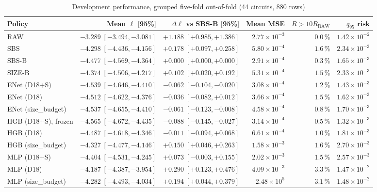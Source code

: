 \begin{table}[p]
\centering
\footnotesize
\setlength{\tabcolsep}{3.0pt}
\caption{Development performance, grouped five-fold out-of-fold (44 circuits, 880 rows)}
\label{tab:qem180-development}
\begin{tabular}{lrrrrr}
\toprule
Policy & Mean $\ell$ [95\%] & $\Delta\ell$ vs SBS-B [95\%] & Mean MSE & $R>10R_{\mathrm{RAW}}$ & $q_{95}$ risk \\
\midrule
RAW & $-3.289\;[-3.494,-3.081]$ & $+1.188\;[+0.985,+1.386]$ & $2.77\times10^{-3}$ & $0.0$\,\% & $1.42\times10^{-2}$ \\
SBS & $-4.298\;[-4.436,-4.156]$ & $+0.178\;[+0.097,+0.258]$ & $5.80\times10^{-4}$ & $1.6$\,\% & $2.34\times10^{-3}$ \\
SBS-B & $-4.477\;[-4.569,-4.364]$ & $+0.000\;[+0.000,+0.000]$ & $2.91\times10^{-4}$ & $0.3$\,\% & $1.65\times10^{-3}$ \\
SIZE-B & $-4.374\;[-4.506,-4.217]$ & $+0.102\;[+0.020,+0.192]$ & $5.31\times10^{-4}$ & $1.5$\,\% & $2.33\times10^{-3}$ \\
\midrule
ENet (D18+S) & $-4.539\;[-4.646,-4.410]$ & $-0.062\;[-0.104,-0.020]$ & $3.08\times10^{-4}$ & $1.2$\,\% & $1.43\times10^{-3}$ \\
ENet (D18) & $-4.512\;[-4.622,-4.376]$ & $-0.036\;[-0.082,+0.012]$ & $3.66\times10^{-4}$ & $1.5$\,\% & $1.62\times10^{-3}$ \\
ENet (size\_budget) & $-4.537\;[-4.655,-4.410]$ & $-0.061\;[-0.123,-0.008]$ & $4.58\times10^{-4}$ & $0.8$\,\% & $1.70\times10^{-3}$ \\
HGB (D18+S), frozen & $-4.565\;[-4.672,-4.435]$ & $-0.088\;[-0.145,-0.027]$ & $3.14\times10^{-4}$ & $0.5$\,\% & $1.32\times10^{-3}$ \\
HGB (D18) & $-4.487\;[-4.618,-4.346]$ & $-0.011\;[-0.094,+0.068]$ & $6.61\times10^{-4}$ & $1.0$\,\% & $1.81\times10^{-3}$ \\
HGB (size\_budget) & $-4.327\;[-4.477,-4.146]$ & $+0.150\;[+0.046,+0.263]$ & $1.58\times10^{-3}$ & $1.6$\,\% & $2.70\times10^{-3}$ \\
MLP (D18+S) & $-4.404\;[-4.531,-4.245]$ & $+0.073\;[-0.003,+0.155]$ & $2.02\times10^{-3}$ & $1.5$\,\% & $2.57\times10^{-3}$ \\
MLP (D18) & $-4.187\;[-4.387,-3.954]$ & $+0.290\;[+0.123,+0.476]$ & $4.09\times10^{-3}$ & $3.3$\,\% & $1.47\times10^{-2}$ \\
MLP (size\_budget) & $-4.282\;[-4.493,-4.034]$ & $+0.194\;[+0.044,+0.379]$ & $2.48\times10^{5}$ & $3.1$\,\% & $1.48\times10^{-2}$ \\

\end{tabular}
\end{table}
